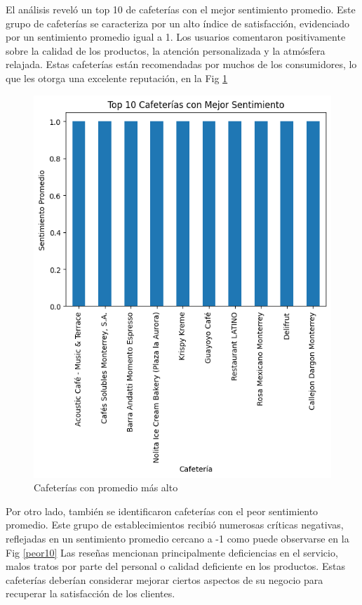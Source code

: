 \documentclass[journal]{IEEEtran}
\begin{document}
El análisis reveló un top 10 de cafeterías con el mejor sentimiento promedio. Este grupo de cafeterías se caracteriza por un alto índice de satisfacción, evidenciado por un sentimiento promedio igual a 1. Los usuarios comentaron positivamente sobre la calidad de los productos, la atención personalizada y la atmósfera relajada. Estas cafeterías están recomendadas por muchos de los consumidores, lo que les otorga una excelente reputación, en la Fig \ref{top10}
\begin{figure}
    \centering
    \includegraphics[width=0.5\linewidth]{Figs/top10.png}
    \caption{Cafeterías con promedio más alto}
    \label{top10}
\end{figure}

Por otro lado, también se identificaron cafeterías con el peor sentimiento promedio. Este grupo de establecimientos recibió numerosas críticas negativas, reflejadas en un sentimiento promedio cercano a -1 como puede observarse en la Fig \ref{peor10} Las reseñas mencionan principalmente deficiencias en el servicio, malos tratos por parte del personal o calidad deficiente en los productos. Estas cafeterías deberían considerar mejorar ciertos aspectos de su negocio para recuperar la satisfacción de los clientes.
\end{document}

